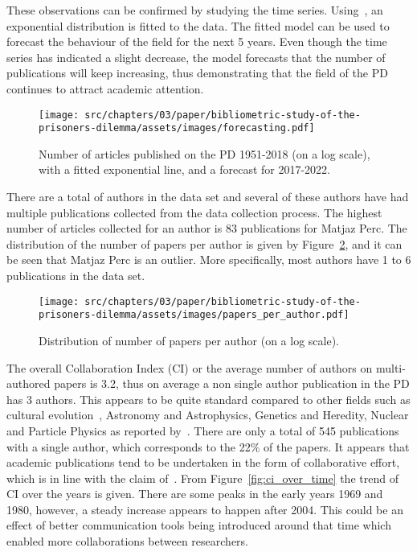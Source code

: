 These observations can be confirmed by studying the time series.
Using~\cite{scipy}, an exponential distribution is fitted to the data.
The fitted model can be used to forecast the
behaviour of the field for the next 5 years. Even
though the time series has indicated a slight decrease, the model forecasts that
the number of publications will keep increasing, thus demonstrating that the
field of the PD continues to attract academic attention.

\begin{figure}[!hbtp]
    \centering
    \texttt{[image: src/chapters/03/paper/bibliometric-study-of-the-prisoners-dilemma/assets/images/forecasting.pdf]}
    \caption{Number of articles published on the PD 1951-2018 (on a log scale),
    with a fitted exponential line, and a forecast for 2017-2022.}\label{fig:timeseries}
\end{figure}

There are a total of \authors authors in the data set and several of these
authors have had multiple publications collected from the data collection process.
The highest number of articles collected for an
author is 83 publications for Matjaz Perc. The distribution of the number of
papers per author is given by Figure~\ref{fig:num_papers_per_author}, and it can
be seen that Matjaz Perc is an outlier. More specifically, most authors have
1 to 6 publications in the data set.

\begin{figure}[!hbtp]
    \centering
    \texttt{[image: src/chapters/03/paper/bibliometric-study-of-the-prisoners-dilemma/assets/images/papers\_per\_author.pdf]}
    \caption{Distribution of number of papers per author (on a log scale).}
    \label{fig:num_papers_per_author}
\end{figure}

The overall Collaboration Index (CI) or the average number of authors on
multi-authored papers is 3.2, thus on average a non single author publication in
the PD has 3 authors. This appears to be quite standard compared to other fields
such as cultural evolution~\cite{youngblood2018}, Astronomy and Astrophysics,
Genetics and Heredity, Nuclear and Particle Physics as reported
by~\cite{nature_author_blog}.
There are only a total of 545 publications with a single author, which
corresponds to the 22\% of the papers. It appears that academic publications
tend to be undertaken in the form of collaborative effort, which is in line
with the claim of~\cite{Kyvik2017}. From
Figure~\ref{fig:ci_over_time} the trend of CI over the years is given. There are
some peaks in the early years 1969 and 1980, however, a steady increase appears
to happen after 2004. This could be an effect of better communication tools
being introduced around that time which enabled more collaborations between
researchers.

